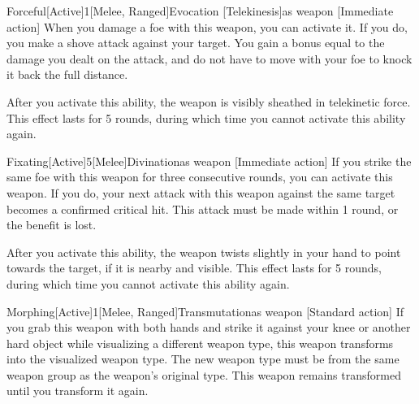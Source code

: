         \begin{magicitemdef}{Forceful}[Active]{1}[Melee, Ranged]{Evocation [Telekinesis]}{as weapon}
            [Immediate action] When you damage a foe with this weapon, you can activate it.
            If you do, you make a shove attack against your target.
            You gain a bonus equal to the damage you dealt on the attack, and do not have to move with your foe to knock it back the full distance.

            After you activate this ability, the weapon is visibly sheathed in telekinetic force.
            This effect lasts for 5 rounds, during which time you cannot activate this ability again.
        \end{magicitemdef}

        \begin{magicitemdef}{Fixating}[Active]{5}[Melee]{Divination}{as weapon}
            [Immediate action] If you strike the same foe with this weapon for three consecutive rounds, you can activate this weapon.
            If you do, your next attack with this weapon against the same target becomes a confirmed critical hit.
            This attack must be made within 1 round, or the benefit is lost.

            After you activate this ability, the weapon twists slightly in your hand to point towards the target, if it is nearby and visible.
            This effect lasts for 5 rounds, during which time you cannot activate this ability again.
        \end{magicitemdef}

        \begin{magicitemdef}{Morphing}[Active]{1}[Melee, Ranged]{Transmutation}{as weapon}
            [Standard action] If you grab this weapon with both hands and strike it against your knee or another hard object while visualizing a different weapon type, this weapon transforms into the visualized weapon type.
            The new weapon type must be from the same weapon group as the weapon's original type.
            This weapon remains transformed until you transform it again.
        \end{magicitemdef}

